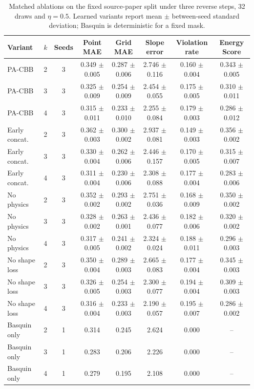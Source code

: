 \begin{table}[t]
\caption{Matched ablations on the fixed source-paper split under three reverse steps, 32 draws and $\eta=0.5$. Learned variants report mean $\pm$ between-seed standard deviation; Basquin is deterministic for a fixed mask.}
\label{tab:completed_ablation}
\centering
\scriptsize
\setlength{\tabcolsep}{3.5pt}
\begin{tabular}{lccccccc}
\toprule
Variant & $k$ & Seeds & Point MAE & Grid MAE & Slope error & Violation rate & Energy Score \\
\midrule
PA-CBB & 2 & 3 & 0.349 $\pm$ 0.005 & 0.287 $\pm$ 0.006 & 2.746 $\pm$ 0.116 & 0.160 $\pm$ 0.004 & 0.343 $\pm$ 0.005 \\
PA-CBB & 3 & 3 & 0.325 $\pm$ 0.009 & 0.254 $\pm$ 0.009 & 2.454 $\pm$ 0.055 & 0.175 $\pm$ 0.005 & 0.310 $\pm$ 0.011 \\
PA-CBB & 4 & 3 & 0.315 $\pm$ 0.011 & 0.233 $\pm$ 0.010 & 2.255 $\pm$ 0.084 & 0.179 $\pm$ 0.003 & 0.286 $\pm$ 0.012 \\
\addlinespace[2pt]
Early concat. & 2 & 3 & 0.362 $\pm$ 0.003 & 0.300 $\pm$ 0.002 & 2.937 $\pm$ 0.081 & 0.149 $\pm$ 0.003 & 0.356 $\pm$ 0.002 \\
Early concat. & 3 & 3 & 0.330 $\pm$ 0.004 & 0.262 $\pm$ 0.006 & 2.446 $\pm$ 0.157 & 0.170 $\pm$ 0.005 & 0.315 $\pm$ 0.007 \\
Early concat. & 4 & 3 & 0.311 $\pm$ 0.004 & 0.230 $\pm$ 0.006 & 2.308 $\pm$ 0.088 & 0.177 $\pm$ 0.004 & 0.283 $\pm$ 0.006 \\
\addlinespace[2pt]
No physics & 2 & 3 & 0.352 $\pm$ 0.002 & 0.293 $\pm$ 0.002 & 2.751 $\pm$ 0.036 & 0.168 $\pm$ 0.009 & 0.350 $\pm$ 0.002 \\
No physics & 3 & 3 & 0.328 $\pm$ 0.002 & 0.263 $\pm$ 0.001 & 2.436 $\pm$ 0.077 & 0.182 $\pm$ 0.006 & 0.320 $\pm$ 0.002 \\
No physics & 4 & 3 & 0.317 $\pm$ 0.005 & 0.241 $\pm$ 0.002 & 2.324 $\pm$ 0.024 & 0.188 $\pm$ 0.011 & 0.296 $\pm$ 0.003 \\
\addlinespace[2pt]
No shape loss & 2 & 3 & 0.350 $\pm$ 0.004 & 0.289 $\pm$ 0.003 & 2.665 $\pm$ 0.083 & 0.177 $\pm$ 0.004 & 0.345 $\pm$ 0.003 \\
No shape loss & 3 & 3 & 0.326 $\pm$ 0.005 & 0.254 $\pm$ 0.003 & 2.300 $\pm$ 0.077 & 0.194 $\pm$ 0.004 & 0.309 $\pm$ 0.003 \\
No shape loss & 4 & 3 & 0.316 $\pm$ 0.004 & 0.233 $\pm$ 0.003 & 2.190 $\pm$ 0.057 & 0.195 $\pm$ 0.007 & 0.286 $\pm$ 0.002 \\
\addlinespace[2pt]
Basquin only & 2 & 1 & 0.314 & 0.245 & 2.624 & 0.000 & -- \\
Basquin only & 3 & 1 & 0.283 & 0.206 & 2.226 & 0.000 & -- \\
Basquin only & 4 & 1 & 0.279 & 0.195 & 2.108 & 0.000 & -- \\
\bottomrule
\end{tabular}
\end{table}
